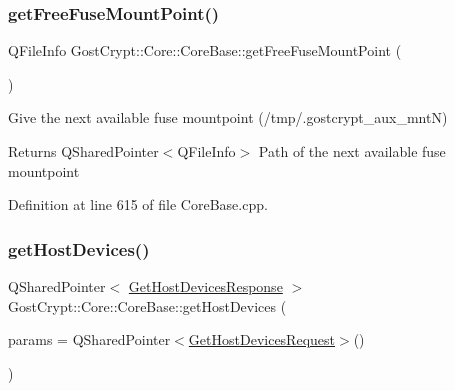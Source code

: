 \mbox{\label{class_gost_crypt_1_1_core_1_1_core_base_a80db2edf1a03b67ae06f3845156e5b77}} 
\subsubsection{\texorpdfstring{get\+Free\+Fuse\+Mount\+Point()}{getFreeFuseMountPoint()}}
{\footnotesize\ttfamily Q\+File\+Info Gost\+Crypt\+::\+Core\+::\+Core\+Base\+::get\+Free\+Fuse\+Mount\+Point (\begin{DoxyParamCaption}{ }\end{DoxyParamCaption})\hspace{0.3cm}{\ttfamily [protected]}}



Give the next available fuse mountpoint (/tmp/.gostcrypt\+\_\+aux\+\_\+mntN) 

\begin{DoxyReturn}{Returns}
Q\+Shared\+Pointer$<$\+Q\+File\+Info$>$ Path of the next available fuse mountpoint 
\end{DoxyReturn}


Definition at line 615 of file Core\+Base.\+cpp.

\mbox{\label{class_gost_crypt_1_1_core_1_1_core_base_ab63be029cc98da2fc116c4223908213e}} 
\subsubsection{\texorpdfstring{get\+Host\+Devices()}{getHostDevices()}}
{\footnotesize\ttfamily Q\+Shared\+Pointer$<$ \hyperlink{struct_gost_crypt_1_1_core_1_1_get_host_devices_response}{Get\+Host\+Devices\+Response} $>$ Gost\+Crypt\+::\+Core\+::\+Core\+Base\+::get\+Host\+Devices (\begin{DoxyParamCaption}\item[{Q\+Shared\+Pointer$<$ \hyperlink{struct_gost_crypt_1_1_core_1_1_get_host_devices_request}{Get\+Host\+Devices\+Request} $>$}]{params = {\ttfamily QSharedPointer$<$\hyperlink{struct_gost_crypt_1_1_core_1_1_get_host_devices_request}{Get\+Host\+Devices\+Request}$>$()} }\end{DoxyParamCaption})\hspace{0.3cm}{\ttfamily [protected]}}



